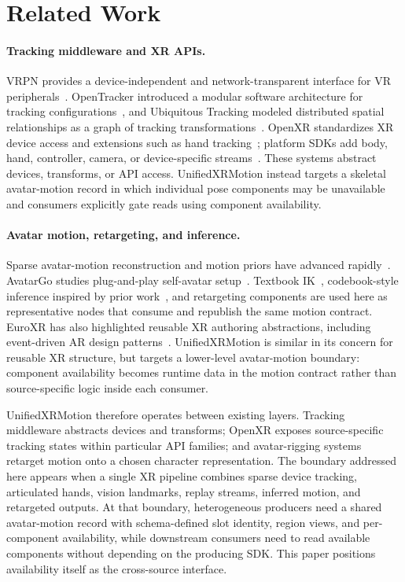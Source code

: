 \documentclass[runningheads]{llncs}
\begin{document}
\section{Related Work}\label{sec:related}
\paragraph{Tracking middleware and XR APIs.}
VRPN provides a device-independent and network-transparent interface for VR peripherals~\cite{taylor2001vrpn}. OpenTracker introduced a modular software architecture for tracking configurations~\cite{reitmayr2001openarchitecture}, and Ubiquitous Tracking modeled distributed spatial relationships as a graph of tracking transformations~\cite{newman2004ubiquitous}. OpenXR standardizes XR device access and extensions such as hand tracking~\cite{khronos_openxr_1_0,openxr_ext_hand}; platform SDKs add body, hand, controller, camera, or device-specific streams~\cite{meta_and_openxr_2025}. These systems abstract devices, transforms, or API access. UnifiedXRMotion instead targets a skeletal avatar-motion record in which individual pose components may be unavailable and consumers explicitly gate reads using component availability.

\paragraph{Avatar motion, retargeting, and inference.}
Sparse avatar-motion reconstruction and motion priors have advanced rapidly~\cite{jiang2022avatarposer,dai2024hmd,starke2024categorical}. AvatarGo studies plug-and-play self-avatar setup~\cite{ponton2022avatargo}. Textbook IK~\cite{aristidou2011fabrik}, codebook-style inference inspired by prior work~\cite{starke2024categorical}, and retargeting components are used here as representative nodes that consume and republish the same motion contract. EuroXR has also highlighted reusable XR authoring abstractions, including event-driven AR design patterns~\cite{ackermann2023arpatterns}. UnifiedXRMotion is similar in its concern for reusable XR structure, but targets a lower-level avatar-motion boundary: component availability becomes runtime data in the motion contract rather than source-specific logic inside each consumer.

UnifiedXRMotion therefore operates between existing layers. Tracking middleware abstracts devices and transforms; OpenXR exposes source-specific tracking states within particular API families; and avatar-rigging systems retarget motion onto a chosen character representation. The boundary addressed here appears when a single XR pipeline combines sparse device tracking, articulated hands, vision landmarks, replay streams, inferred motion, and retargeted outputs. At that boundary, heterogeneous producers need a shared avatar-motion record with schema-defined slot identity, region views, and per-component availability, while downstream consumers need to read available components without depending on the producing SDK. This paper positions availability itself as the cross-source interface.
\end{document}
